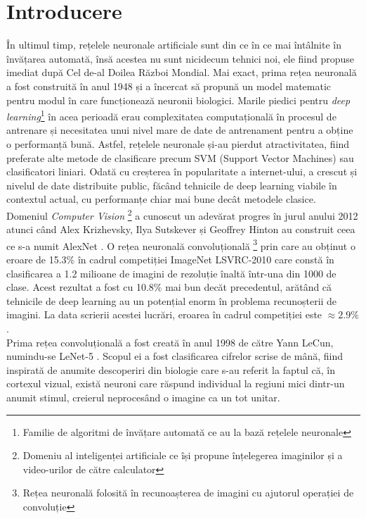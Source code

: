 \section{Introducere}
În ultimul timp, rețelele neuronale artificiale sunt din ce în ce mai întâlnite în învățarea automată, însă acestea nu sunt nicidecum tehnici noi, ele fiind propuse imediat după Cel de-al Doilea Război Mondial. Mai exact, prima rețea neuronală a fost construită în anul 1948 și a încercat să propună un model matematic pentru modul în care funcționează neuronii biologici. Marile piedici pentru \textit{deep learning}\footnote{Familie de algoritmi de învățare automată ce au la bază rețelele neuronale} în acea perioadă erau complexitatea computațională în procesul de antrenare și necesitatea unui nivel mare de date de antrenament pentru a obține o performanță bună. Astfel, rețelele neuronale și-au pierdut atractivitatea, fiind preferate alte metode de clasificare precum SVM (Support Vector Machines) sau clasificatori liniari. Odată cu creșterea în popularitate a internet-ului, a crescut și nivelul de date distribuite public, făcând tehnicile de deep learning viabile în contextul actual, cu performanțe chiar mai bune decât metodele clasice.\\

Domeniul \textit{Computer Vision} \footnote{Domeniu al inteligenței artificiale ce își propune înțelegerea imaginilor și a video-urilor de către calculator} a cunoscut un adevărat progres în jurul anului 2012 atunci când Alex Krizhevsky, Ilya Sutskever și Geoffrey Hinton au construit ceea ce s-a numit AlexNet \cite{alexnet}. O rețea neuronală convoluțională \footnote{Rețea neuronală folosită în recunoașterea de imagini cu ajutorul operației de convoluție} prin care au obținut o eroare de 15.3\% în cadrul competiției ImageNet LSVRC-2010 care constă în clasificarea a 1.2 milioane de imagini de rezoluție înaltă într-una din 1000 de clase. Acest rezultat a fost cu 10.8\% mai bun decăt precedentul, arătând că tehnicile de deep learning au un potențial enorm în problema recunoșterii de imagini. La data scrierii acestei lucrări, eroarea în cadrul competiției este $\approx 2.9\%$.\\

Prima rețea convoluțională a fost creată în anul 1998 de către Yann LeCun, numindu-se LeNet-5  \cite{lenet}. Scopul ei a fost clasificarea cifrelor scrise de mână, fiind inspirată de anumite descoperiri din biologie care s-au referit la faptul că, în cortexul vizual, există neuroni care răspund individual la regiuni mici dintr-un anumit stimul, creierul neprocesând o imagine ca un tot unitar. \\

